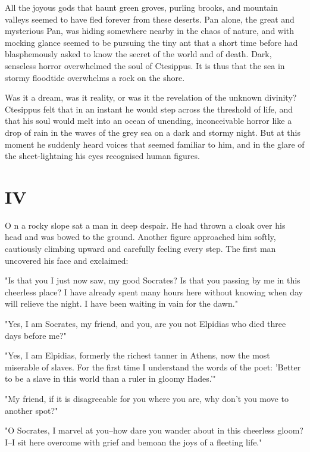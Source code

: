 All the joyous gods that haunt green groves, purling brooks, and
mountain valleys seemed to have fled forever from these deserts. Pan
alone, the great and mysterious Pan, was hiding somewhere nearby in
the chaos of nature, and with mocking glance seemed to be pursuing the
tiny ant that a short time before had blasphemously asked to know the
secret of the world and of death. Dark, senseless horror overwhelmed
the soul of Ctesippus. It is thus that the sea in stormy floodtide
overwhelms a rock on the shore.

Was it a dream, was it reality, or was it the revelation of the
unknown divinity? Ctesippus felt that in an instant he would step
across the threshold of life, and that his soul would melt into an
ocean of unending, inconceivable horror like a drop of rain in the
waves of the grey sea on a dark and stormy night. But at this moment
he suddenly heard voices that seemed familiar to him, and in the glare
of the sheet-lightning his eyes recognised human figures.



\section{IV}


\lettrine[lines=3,lhang=0.11,lraise=0,loversize=0.05]{O}{}%
n a rocky slope sat a man in deep despair. He had thrown a cloak over
his head and was bowed to the ground. Another figure approached him
softly, cautiously climbing upward and carefully feeling every step.
The first man uncovered his face and exclaimed:

"Is that you I just now saw, my good Socrates? Is that you passing by
me in this cheerless place? I have already spent many hours here
without knowing when day will relieve the night. I have been waiting
in vain for the dawn."

"Yes, I am Socrates, my friend, and you, are you not Elpidias who died
three days before me?"

"Yes, I am Elpidias, formerly the richest tanner in Athens, now the
most miserable of slaves. For the first time I understand the words of
the poet: 'Better to be a slave in this world than a ruler in gloomy
Hades.'"

"My friend, if it is disagreeable for you where you are, why don't you
move to another spot?"

"O Socrates, I marvel at you--how dare you wander about in this
cheerless gloom? I--I sit here overcome with grief and bemoan the joys
of a fleeting life."

